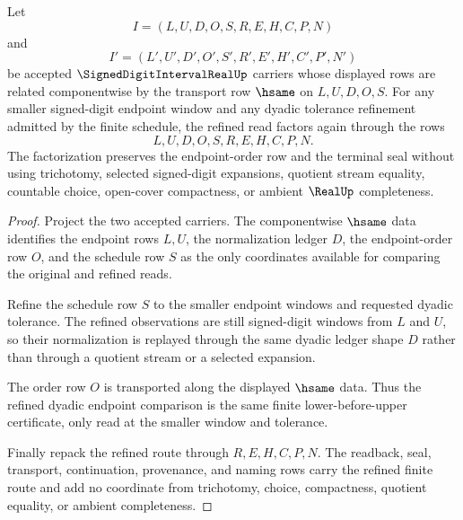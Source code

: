 \begin{theorem}
\label{thm:signed-digit-interval-real-refinement-stability}
Let
$$
I=(L,U,D,O,S,R,E,H,C,P,N)
$$
and
$$
I'=(L',U',D',O',S',R',E',H',C',P',N')
$$
be accepted $\SignedDigitIntervalRealUp$ carriers whose displayed rows are related componentwise by the transport row $\hsame$ on $L,U,D,O,S$. For any smaller signed-digit endpoint window and any dyadic tolerance refinement admitted by the finite schedule, the refined read factors again through the rows
$$
L,U,D,O,S,R,E,H,C,P,N.
$$
The factorization preserves the endpoint-order row and the terminal seal without using trichotomy, selected signed-digit expansions, quotient stream equality, countable choice, open-cover compactness, or ambient $\RealUp$ completeness.
\end{theorem}
\begin{proof}
Project the two accepted carriers. The componentwise $\hsame$ data identifies the endpoint rows $L,U$, the normalization ledger $D$, the endpoint-order row $O$, and the schedule row $S$ as the only coordinates available for comparing the original and refined reads.

Refine the schedule row $S$ to the smaller endpoint windows and requested dyadic tolerance. The refined observations are still signed-digit windows from $L$ and $U$, so their normalization is replayed through the same dyadic ledger shape $D$ rather than through a quotient stream or a selected expansion.

The order row $O$ is transported along the displayed $\hsame$ data. Thus the refined dyadic endpoint comparison is the same finite lower-before-upper certificate, only read at the smaller window and tolerance.

Finally repack the refined route through $R,E,H,C,P,N$. The readback, seal, transport, continuation, provenance, and naming rows carry the refined finite route and add no coordinate from trichotomy, choice, compactness, quotient equality, or ambient completeness.
\end{proof}

